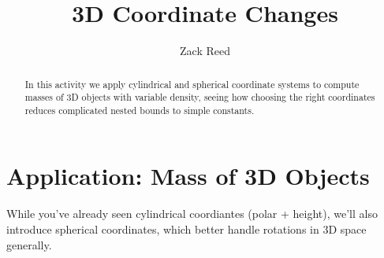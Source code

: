 \documentclass{ximera}
\title{3D Coordinate Changes}
\author{Zack Reed}
\begin{document}
\begin{abstract}
In this activity we apply cylindrical and spherical coordinate systems to compute masses of 3D objects with variable density, seeing how choosing the right coordinates reduces complicated nested bounds to simple constants.
\end{abstract}
\maketitle


\section*{Application: Mass of 3D Objects}

While you've already seen cylindrical coordiantes (polar + height), we'll also introduce spherical coordinates, which better handle rotations in 3D space generally.
\end{document}
